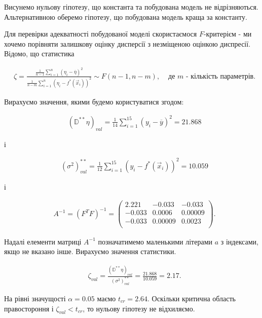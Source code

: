 \documentclass[14pt,a4paper]{scrartcl}
\theoremstyle{definition}
\theoremstyle{remark}
\theoremstyle{definition}
\theoremstyle{definition}
\begin{document}
Висунемо нульову гіпотезу, що константа та побудована модель не відрізняються. Альтернативною оберемо гіпотезу, що побудована модель краща за константу.

Для перевірки адекватності побудованої моделі скористаємося $F$-критерієм - ми хочемо порівняти залишкову оцінку дисперсії з незміщеною оцінкою диспресії. Відомо, що статистика

\begin{align*}
  & \zeta = \frac{\frac{1}{n - 1} \sum_{i = 1}^{n} (\eta_{i} - \overline{\eta})^2}{\frac{1}{n - m} \sum_{i = 1}^{n} (\eta_{i} - f^{*}(\vec{x}_{i}))^2} \sim F(n - 1, n - m),  & \text{  де  } m \text{ - кількість параметрів.}
\end{align*}

Вирахуємо значення, якими будемо користуватися згодом:

\begin{align*}
   & (\mathbb{D}^{**}\eta)_{val} = \frac{1}{14} \sum_{i = 1}^{15} (y_{i} - \overline{y})^2 = 21.868
\end{align*}

і

\begin{align*}
   & (\sigma^2)^{**}_{val} = \frac{1}{12} \sum_{i = 1}^{15} (y_{i} - f^{*}(\vec{x}_{i}))^2 = 10.059
\end{align*}

і

\begin{align*}
  & A^{-1} = (F^{T}F)^{-1} = \begin{pmatrix}
    2.221 & -0.033 & -0.033 \\
    -0.033 & 0.0006 & 0.00009 \\
    -0.033 & 0.00009 & 0.0023 \\
  \end{pmatrix}.
\end{align*}

Надалі елементи матриці $A^{-1}$ позначатимемо маленькими літерами $a$ з індексами, якщо не вказано інше. Вирахуємо значення статистики.

\begin{align*}
  & \zeta_{val} = \frac{(\mathbb{D}^{**}\eta)_{val}}{(\sigma^2)^{**}_{val}} = \frac{21.868}{10.059} = 2.17.
\end{align*}

На рівні значущості $\alpha = 0.05$ маємо $t_{cr} = 2.64$. Оскільки критична область правостороння і $\zeta_{val} < t_{cr}$, то нульову гіпотезу не відхиляємо.
\end{document}
